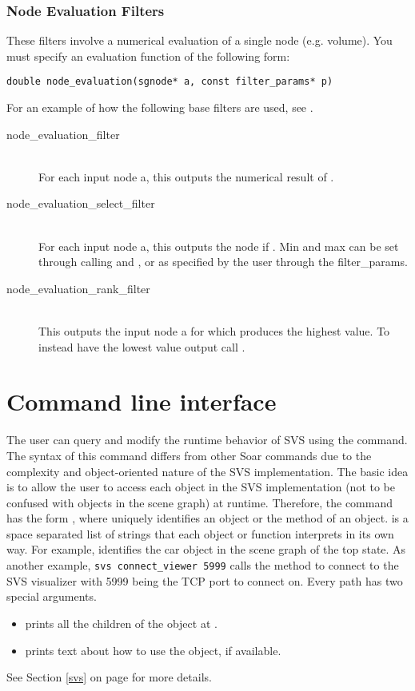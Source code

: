 \subsubsection{Node Evaluation Filters}

These filters involve a numerical evaluation of a single node (e.g. volume). 
You must specify an evaluation function of the following form:

\begin{verbatim}
double node_evaluation(sgnode* a, const filter_params* p)
\end{verbatim}

For an example of how the following base filters are used, see .

\begin{description}
	\item[node\_evaluation\_filter] \hfill \\
		For each input node a, this outputs the numerical result of . 
	\item[node\_evaluation\_select\_filter] \hfill \\
		For each input node a, this outputs the node if . Min and max can be set through calling  and , or as specified by the user through the filter\_params. 
	\item[node\_evaluation\_rank\_filter] \hfill \\
		This outputs the input node a for which  produces the highest value. To instead have the lowest value output call .
\end{description}


\section{Command line interface}

The user can query and modify the runtime behavior of SVS using the  command.
The syntax of this command differs from other Soar commands due to the complexity and object-oriented nature of the SVS implementation.
The basic idea is to allow the user to access each object in the SVS implementation (not to be confused with objects in the scene graph) at runtime.
Therefore, the command has the form , where  uniquely identifies an object or the method of an object.
 is a space separated list of strings that each object or function interprets in its own way.
For example,  identifies the car object 
in the scene graph of the top state.
As another example, \verb|svs connect_viewer 5999| calls the method to connect to the SVS visualizer with 5999 being the TCP port to connect on.
Every path has two special arguments.

\begin{itemize}
	\item{} prints all the children of the object at .
	\item{} prints text about how to use the object, if available.
\end{itemize}

See Section \ref{svs} on page \pageref{svs} for more details.